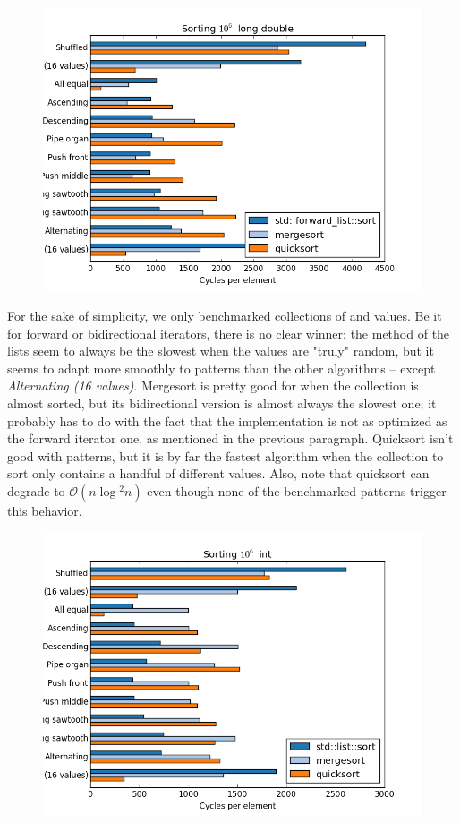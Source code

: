 \documentclass{isocpp_proposal}
\begin{document}
\begin{appendices}
\begin{figure}[h]
\includegraphics[width=\textwidth]{forward-list-long-double.png}
\end{figure}

For the sake of simplicity, we only benchmarked collections of  and  values. Be it for forward or bidirectional iterators, there is no clear winner: the  method of the lists seem to always be the slowest when the values are "truly" random, but it seems to adapt more smoothly to patterns than the other algorithms -- except \emph{Alternating (16 values)}. Mergesort is pretty good for  when the collection is almost sorted, but its bidirectional version is almost always the slowest one; it probably has to do with the fact that the implementation is not as optimized as the forward iterator one, as mentioned in the previous paragraph. Quicksort isn't good with patterns, but it is by far the fastest algorithm when the collection to sort only contains a handful of different values. Also, note that quicksort can degrade to $\mathcal{O}(n \log{}^2 n)$ even though none of the benchmarked patterns trigger this behavior.

\begin{figure}[h]
\includegraphics[width=\textwidth]{list-int.png}
\end{figure}


\end{appendices}
\end{document}
